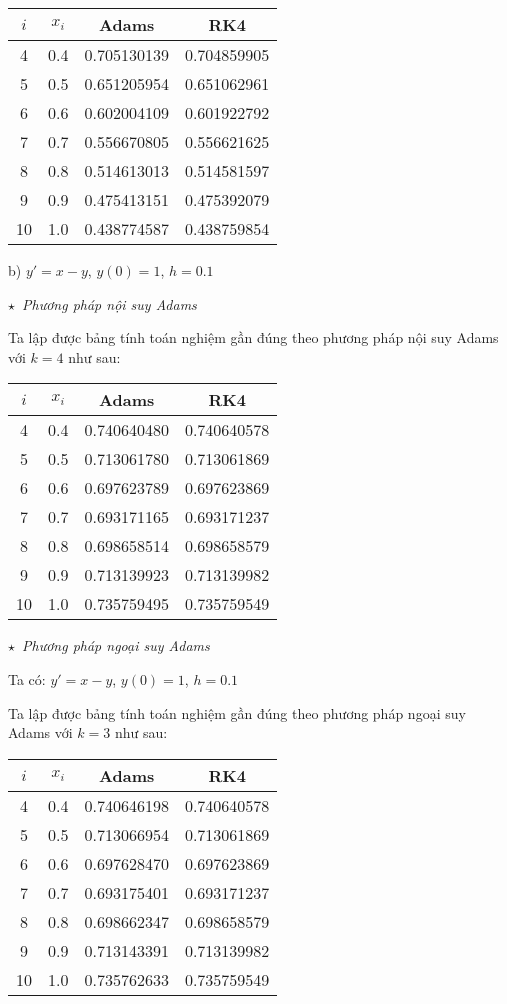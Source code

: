 \begin{longtable}{|c|c|c|c|}
\hline
$i$&$x_i$&Adams&RK4\\ \hline
\endhead
4 &0.4 &0.705130139 &0.704859905\\ \hline
5 &0.5 &0.651205954 &0.651062961\\ \hline
6 &0.6 &0.602004109 &0.601922792\\ \hline
7 &0.7 &0.556670805 &0.556621625\\ \hline
8 &0.8 &0.514613013 &0.514581597\\ \hline
9 &0.9 &0.475413151 &0.475392079\\ \hline
10 &1.0 &0.438774587 &0.438759854\\ \hline
\end{longtable}

b) $y'=x-y$, $y(0)=1$, $h=0.1$\par

$\star$~\textit{Phương pháp nội suy Adams}\par
Ta lập được bảng tính toán nghiệm gần đúng theo phương pháp nội suy Adams với $k=4$ như sau:

\begin{longtable}{|c|c|c|c|}\hline
$i$&$x_i$&Adams&RK4\\ \hline
\endhead
4  &0.4 &0.740640480 &0.740640578\\ \hline
5  &0.5 &0.713061780 &0.713061869\\ \hline
6  &0.6 &0.697623789 &0.697623869\\ \hline
7  &0.7 &0.693171165 &0.693171237\\ \hline
8  &0.8 &0.698658514 &0.698658579\\ \hline
9  &0.9 &0.713139923 &0.713139982\\ \hline
10 &1.0 &0.735759495 &0.735759549\\ \hline
\end{longtable}

$\star$~\textit{Phương pháp ngoại suy Adams}\par
Ta có: $y'=x-y$, $y(0)=1$, $h=0.1$\par
Ta lập được bảng tính toán nghiệm gần đúng theo phương pháp ngoại suy Adams với $k=3$ như sau:

\begin{longtable}{|c|c|c|c|}\hline
$i$&$x_i$&Adams&RK4\\ \hline
\endhead
4  &0.4 &0.740646198 &0.740640578\\ \hline
5  &0.5 &0.713066954 &0.713061869\\ \hline
6  &0.6 &0.697628470 &0.697623869\\ \hline
7  &0.7 &0.693175401 &0.693171237\\ \hline
8  &0.8 &0.698662347 &0.698658579\\ \hline
9  &0.9 &0.713143391 &0.713139982\\ \hline
10 &1.0 &0.735762633 &0.735759549\\ \hline
\end{longtable}


